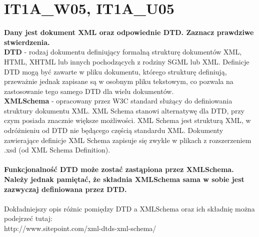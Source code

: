 \vspace{0.4cm}
\noindent

\section{IT1A\_W05, IT1A\_U05}
\textbf{Dany jest dokument XML oraz odpowiednie DTD. Zaznacz prawdziwe stwierdzenia.}\\

\textbf{DTD} -  rodzaj dokumentu definiujący formalną strukturę dokumentów XML, HTML, XHTML lub innych
 pochodzących z rodziny SGML lub XML. Definicje DTD mogą być zawarte w pliku dokumentu, którego strukturę definiują, przeważnie jednak zapisane są w osobnym pliku tekstowym, co pozwala na zastosowanie tego samego DTD dla wielu dokumentów.\\

\textbf{XMLSchema} - opracowany przez W3C standard służący do definiowania struktury dokumentu XML. XML Schema stanowi alternatywę dla DTD, przy czym posiada znacznie większe możliwości. XML Schema jest strukturą XML, w odróżnieniu od DTD nie będącego częścią standardu XML. Dokumenty zawierające definicje XML Schema zapisuje się zwykle w plikach z rozszerzeniem .xsd (od XML Schema Definition).
\\
\\
\textbf{Funkcjonalność DTD może zostać zastąpiona przez XMLSchema. Należy jednak pamiętać, że składnia XMLSchema sama w sobie jest zazwyczaj definiowana przez DTD.}\\
\\
Dokładniejszy opis różnic pomiędzy DTD a XMLSchema oraz ich składnię można podejrzeć tutaj:\\
http://www.sitepoint.com/xml-dtds-xml-schema/